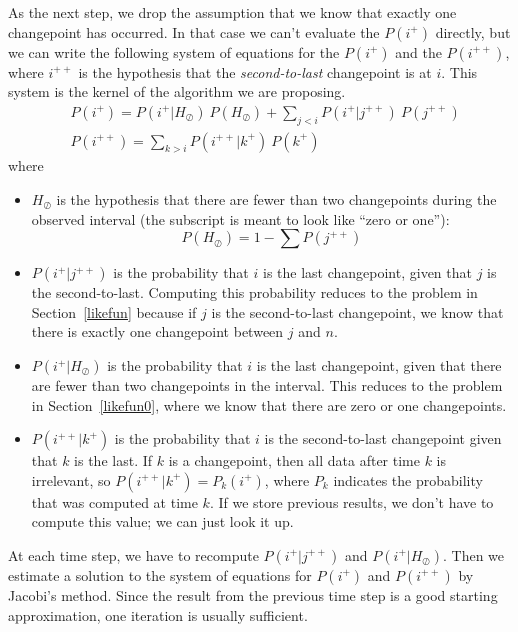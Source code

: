 \documentclass[twocolumn,11pt]{article}
\begin{document}
As the next step, we drop the assumption that we know that exactly one
changepoint has occurred.  In that case we can't evaluate the $P(i^+)$
directly, but we can write the following system of equations for the
$P(i^+)$ and the $P(i^{++})$, where $i^{++}$ is the hypothesis
that the {\em second-to-last} changepoint is at $i$.  This system is
the kernel of the algorithm we are proposing.
%
\renewcommand{\P}{\ P}
\newcommand{\jc}{H_\oslash}
%
\begin{equation}
\begin{split}
&P(i^+) = P(i^+ | \jc) \P(\jc) + \sum_{j<i} P(i^+ | j^{++}) \P(j^{++})   \\
&P(i^{++}) = \sum_{k>i} P(i^{++} | k^+) \P(k^+) 
\label{cpp}
\end{split}
\end{equation}
%
where
%
\begin{itemize}
%
\item $\jc$ is the hypothesis that there are fewer than two
changepoints during the observed interval (the subscript is meant
to look like ``zero or one''):
%
\begin{equation}
P(\jc) = 1 - \sum P(j^{++})
\end{equation}
%
\item $P(i^+ | j^{++})$ is the probability that $i$ is the last
changepoint, given that $j$ is the second-to-last.  Computing this
probability reduces to the problem in Section~\ref{likefun}
because if $j$ is the second-to-last changepoint,
we know that there is exactly one changepoint between $j$ and $n$.
%
\item $P(i^+ | \jc)$ is the probability that $i$ is the last
changepoint, given that there are fewer than two changepoints in the
interval.  This reduces to the problem in Section~\ref{likefun0},
where we know that there are zero or one changepoints.
%
\item $P(i^{++} | k^+)$ is the probability that $i$ is the
second-to-last changepoint given that $k$ is the last.  If $k$ is a
changepoint, then all data after time $k$ is irrelevant, so $P(i^{++}
| k^+) = P_k(i^+)$, where $P_k$ indicates the probability that was
computed at time $k$.  If we store previous results, we don't
have to compute this value; we can just look it up.
%
\end{itemize}
%
At each time step, we have to recompute $P(i^+ | j^{++})$ and $P(i^+ |
\jc)$.  Then we estimate a solution to the system of equations for
$P(i^+)$ and $P(i^{++})$ by Jacobi's method.
Since the result from the previous time
step is a good starting approximation, one iteration
is usually sufficient.
\end{document}
